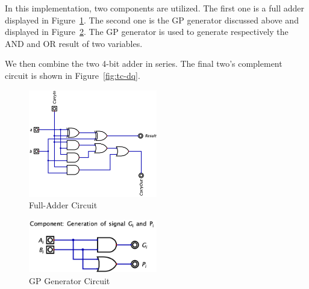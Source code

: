 \documentclass[conference]{IEEEtran}
\begin{document}
In this implementation, two components are utilized.
The first one is a full adder displayed in Figure~\ref{fig:full_adder}. The second one is the GP generator discussed above and displayed in Figure~\ref{fig:gp_generator}. The GP generator is used to generate respectively the AND and OR result of two variables.

We then combine the two 4-bit adder in series. The final two's complement circuit is shown in Figure~\ref{fig:tc-dq}.

\begin{figure}[h!]
    \centering
    \includegraphics[width=0.5\textwidth]{assets/full_adder.png}
    \caption{Full-Adder Circuit}
    \label{fig:full_adder}
    \end{figure}

    \begin{figure}[h!]
        \centering
        \includegraphics[width=0.5\textwidth]{assets/generate_gp.png}
        \caption{GP Generator Circuit}
        \label{fig:gp_generator}
        \end{figure}
\end{document}

